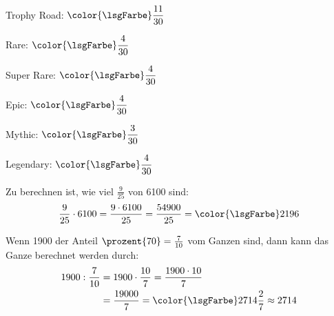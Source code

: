 \documentclass[12pt,a5paper,landscape]{scrartcl}
\def\clrLsg{\color{\lsgFarbe}}
\begin{document}
	\begin{loesungskarte}
		\begin{multicols}{2}
		\begin{enumeratea}
			\item \begin{smallitemize}
				\item Trophy Road: $\clrLsg\dfrac{11}{30}$
				\item Rare: $\clrLsg\dfrac{4}{30}$
				\item Super Rare: $\clrLsg\dfrac{4}{30}$
				\item Epic: $\clrLsg\dfrac{4}{30}$
				\item Mythic: $\clrLsg\dfrac{3}{30}$
				\item Legendary: $\clrLsg\dfrac{4}{30}$
			\end{smallitemize}
			
			\item Zu berechnen ist, wie viel $\tfrac{9}{25}$ von \num{6100} sind:
			\[ \frac{9}{25}\cdot 6100 = \frac{9\cdot 6100}{25} = \frac{54900}{25} = \clrLsg2196 \]
			
			\item Wenn \num{1900} der Anteil $\prozent{70} = \frac{7}{10}$ vom Ganzen sind, dann kann das Ganze berechnet werden durch:
			\begin{align*}
				1900: \frac{7}{10} &= 1900\cdot \frac{10}{7} = \frac{1900\cdot 10}{7} \\
				&= \frac{19000}{7} = \clrLsg 2714\frac{2}{7}\approx 2714
			\end{align*}
		\end{enumeratea}
		\end{multicols}
	\end{loesungskarte}
	
\end{document}
